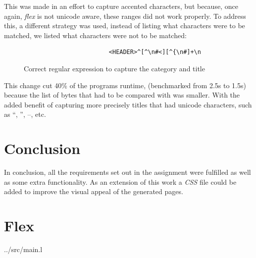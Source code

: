 \documentclass[a4paper]{report}
\begin{document}
This was made in an effort to capture accented characters, but because, once
again, \textit{flex} is not unicode aware, these ranges did not work properly.
To address this, a different strategy was used, instead of listing what
characters were to be matched, we listed what characters were not to be
matched:

\begin{figure}[H]
    \centering
    \begin{verbatim}
                        <HEADER>^[^\n#<][^{\n#]+\n
    \end{verbatim}
    \caption{Correct regular expression to capture the category and title}
\end{figure}

This change cut 40\% of the programs runtime, (benchmarked from 2.5s to 1.5s)
because the list of bytes that had to be compared with was smaller. With the
added benefit of capturing more precisely titles that had unicode characters,
such as  ``,  '', --, etc.

\chapter{Conclusion}

In conclusion, all the requirements set out in the assignment were fulfilled as
well as some extra functionality. As an extension of this work a \textit{CSS}
file could be added to improve the visual appeal of the generated pages.

\appendix

\chapter{Flex}


{../src/main.l}
\end{document}
